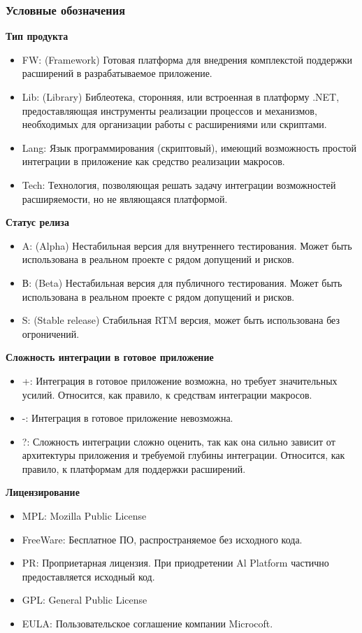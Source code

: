 \subsubsection{Условные обозначения}

{\bf Тип продукта}

\begin{itemize}
	\item FW: (Framework) Готовая платформа для внедрения комплекстой поддержки расширений в разрабатываемое приложение.
	\item Lib: (Library) Библеотека, сторонняя, или встроенная в платформу .NET, предоставляющая инструменты реализации процессов и механизмов, необходимых для организации работы с расширениями или скриптами.
	\item Lang: Язык программирования (скриптовый), имеющий возможность простой интеграции в приложение как средство реализации макросов. 
	\item Tech: Технология, позволяющая решать задачу интеграции возможностей расширяемости, но не являющаяся платформой.
\end{itemize}

{\bf Статус релиза}

\begin{itemize}
	\item A: (Alpha) Нестабильная версия для внутреннего тестирования. Может быть использована в реальном проекте с рядом допущений и рисков.
	\item В: (Beta) Нестабильная версия для публичного тестирования. Может быть использована в реальном проекте с рядом допущений и рисков.
	\item S: (Stable release) Стабильная RTM версия, может быть использована без огроничений.
\end{itemize}

{\bf Сложность интеграции в готовое приложение}

\begin{itemize}
	\item +: Интеграция в готовое приложение возможна, но требует значительных усилий. Относится, как правило, к средствам интеграции макросов.
	\item -: Интеграция в готовое приложение невозможна.
	\item ?: Сложность интеграции сложно оценить, так как она сильно зависит от архитектуры приложения и требуемой глубины интеграции. Относится, как правило, к платформам для поддержки расширений.
\end{itemize}

{\bf Лицензирование}

\begin{itemize}
	\item MPL: Mozilla Public License
	\item FreeWare: Бесплатное ПО, распространяемое без исходного кода.
	\item PR: Проприетарная лицензия. При приодретении Al Platform частично предоставляется исходный код.
	\item GPL: General Public License
	\item EULA: Пользовательское соглашение компании Microcoft.
\end{itemize}